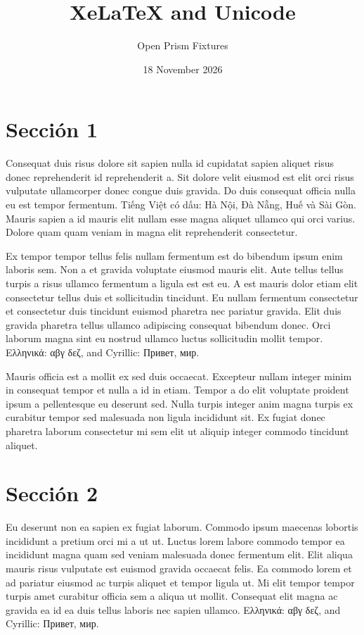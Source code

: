\documentclass[11pt,a4paper]{article}
\title{XeLaTeX and Unicode}
\author{Open Prism Fixtures}
\date{18 November 2026}
\begin{document}
\maketitle

\section{Sección 1}
Consequat duis risus dolore sit sapien nulla id cupidatat sapien aliquet
risus donec reprehenderit id reprehenderit a. Sit dolore velit eiusmod
est elit orci risus vulputate ullamcorper donec congue duis gravida. Do
duis consequat officia nulla eu est tempor fermentum. Tiếng Việt có dấu:
Hà Nội, Đà Nẵng, Huế và Sài Gòn. Mauris sapien a id mauris elit nullam
esse magna aliquet ullamco qui orci varius. Dolore quam quam veniam in
magna elit reprehenderit consectetur.

Ex tempor tempor tellus felis nullam fermentum est do bibendum ipsum
enim laboris sem. Non a et gravida voluptate eiusmod mauris elit. Aute
tellus tellus turpis a risus ullamco fermentum a ligula est est eu. A
est mauris dolor etiam elit consectetur tellus duis et sollicitudin
tincidunt. Eu nullam fermentum consectetur et consectetur duis tincidunt
euismod pharetra nec pariatur gravida. Elit duis gravida pharetra tellus
ullamco adipiscing consequat bibendum donec. Orci laborum magna sint eu
nostrud ullamco luctus sollicitudin mollit tempor. Ελληνικά: αβγ δεζ,
and Cyrillic: Привет, мир.

Mauris officia est a mollit ex sed duis occaecat. Excepteur nullam
integer minim in consequat tempor et nulla a id in etiam. Tempor a do
elit voluptate proident ipsum a pellentesque eu deserunt sed. Nulla
turpis integer anim magna turpis ex curabitur tempor sed malesuada non
ligula incididunt sit. Ex fugiat donec pharetra laborum consectetur mi
sem elit ut aliquip integer commodo tincidunt aliquet.

\section{Sección 2}
Eu deserunt non ea sapien ex fugiat laborum. Commodo ipsum maecenas
lobortis incididunt a pretium orci mi a ut ut. Luctus lorem labore
commodo tempor ea incididunt magna quam sed veniam malesuada donec
fermentum elit. Elit aliqua mauris risus vulputate est euismod gravida
occaecat felis. Ea commodo lorem et ad pariatur eiusmod ac turpis
aliquet et tempor ligula ut. Mi elit tempor tempor turpis amet curabitur
officia sem a aliqua ut mollit. Consequat elit magna ac gravida ea id ea
duis tellus laboris nec sapien ullamco. Ελληνικά: αβγ δεζ, and Cyrillic:
Привет, мир.
\end{document}
